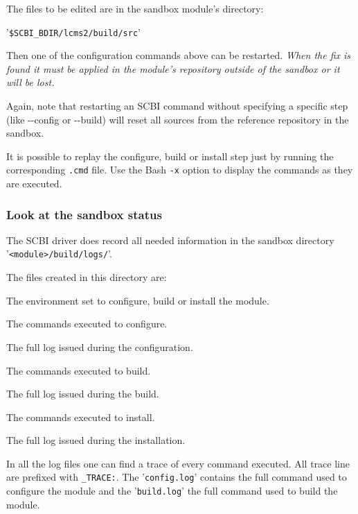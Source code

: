 \documentclass[a4paper,12pt,twoside]{article}
\newcommand{\code}[1]{\texttt{#1}}
\renewcommand{\emph}[1]{\textit{#1}}
\newcommand{\file}[1]{'{\texttt{#1}}'}
\newcommand{\ddash}{-{}-}
\begin{document}
The files to be edited are in the sandbox module's directory:

\file{\$SCBI\_BDIR/lcms2/build/src}

Then one of the configuration commands above can be restarted. \emph{When the fix is found it must be applied in the module's repository outside of the sandbox or it will be lost.}

Again, note that restarting an SCBI command without specifying a specific step (like \ddash{config} or \ddash{build}) will reset all sources from the reference repository in the sandbox.

It is possible to replay the configure, build or install step just by running the corresponding \code{.cmd} file. Use the Bash \code{-x} option to display the commands as they are executed.

\subsubsection{Look at the sandbox status}

The SCBI driver does record all needed information in the sandbox directory \file{<module>/build/logs/}.

The files created in this directory are:

\begin{description}[font=\file,style=standard]
	\item[env.cmd] \tabto{3cm} The environment set to configure, build or install the module.
	\item[config.cmd] \tabto{3cm} The commands executed to configure.
	\item[config.log] \tabto{3cm} The full log issued during the configuration.
	\item[build.cmd] \tabto{3cm} The commands executed to build.
	\item[build.log] \tabto{3cm} The full log issued during the build.
	\item[install.cmd] \tabto{3cm} The commands executed to install.
	\item[install.log] \tabto{3cm} The full log issued during the installation.
\end{description}

In all the log files one can find a trace of every command executed. All trace line are prefixed with \code{\_TRACE:}. The \file{config.log} contains the full command used to configure the module and the \file{build.log} the full command used to build the module.
\end{document}
